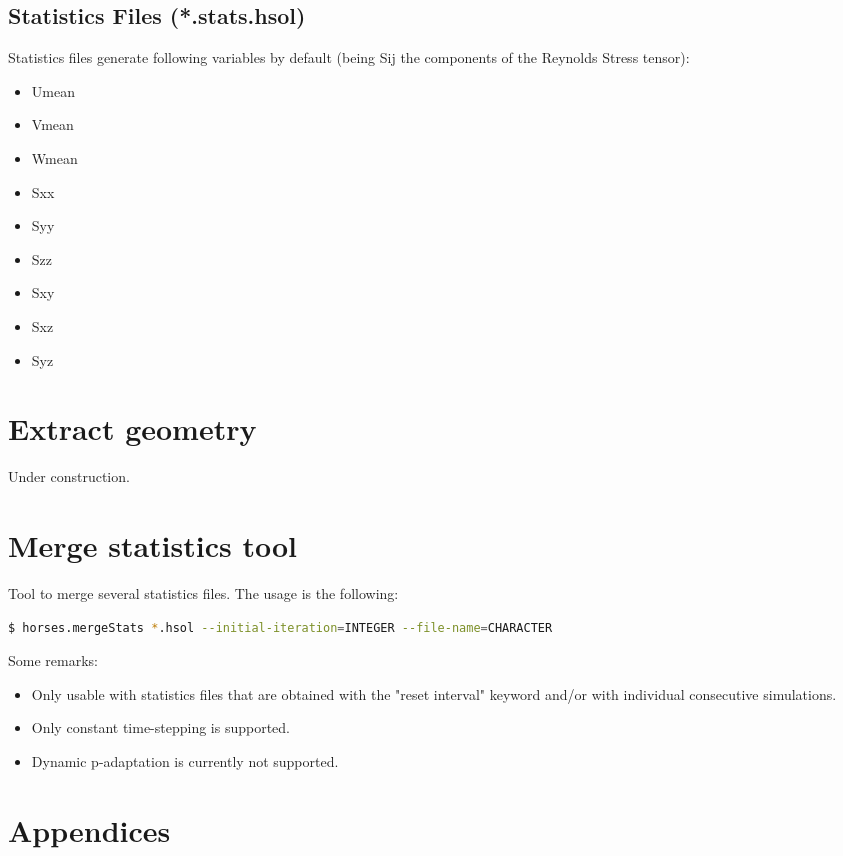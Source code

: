 \documentclass[a4paper,10pt]{report}
\begin{document}
\subsection{Statistics Files (*.stats.hsol)}
Statistics files generate following variables by default (being Sij the components of the Reynolds Stress tensor):

\begin{multicols}{3}
\begin{itemize}
\item Umean
\item Vmean
\item Wmean
\item Sxx
\item Syy
\item Szz
\item Sxy
\item Sxz
\item Syz
\end{itemize}
\end{multicols}

\section{Extract geometry}
Under construction.

\section{Merge statistics tool}

Tool to merge several statistics files. The usage is the following:

\begin{lstlisting}[language=bash]
	$ horses.mergeStats *.hsol --initial-iteration=INTEGER --file-name=CHARACTER
\end{lstlisting}

Some remarks:
\begin{itemize}
\item Only usable with statistics files that are obtained with the "reset interval" keyword and/or with individual consecutive simulations.
\item Only constant time-stepping is supported.
\item Dynamic p-adaptation is currently not supported.
\end{itemize}

\clearpage
\section*{Appendices}
\end{document}
